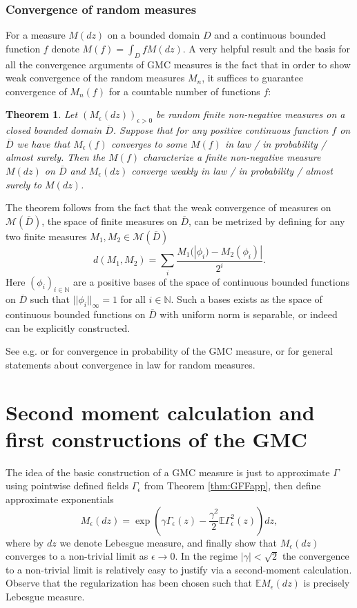 \documentclass[11pt]{amsart}
\newtheorem{thm}{Theorem}[section]
\newcommand{\N}{\mathbb N}
\newcommand{\E}{\mathbb E}
\renewcommand{\1}{\mathbf 1}
\newcommand{\eps}{\epsilon}
\begin{document}
\subsubsection{Convergence of random measures}
For a measure $M(dz)$ on a bounded domain $D$ and a continuous bounded function $f$ denote $M(f) = \int_D f M(dz)$. A very helpful result and the basis for all the convergence arguments of GMC measures is the fact that in order to show weak convergence of the random measures $M_n$, it suffices to guarantee convergence of $M_n(f)$ for a countable number of functions $f$:
 
\begin{thm}\label{thm:conv}
Let $(M_\eps(dz))_{\eps > 0}$ be random finite non-negative measures on a closed bounded domain $\overline{D}$. Suppose that for any positive continuous function $f$ on $\overline{D}$ we have that $M_\eps(f)$ converges to some $M(f)$ in law / in probability / almost surely. Then the $M(f)$ characterize a finite non-negative measure $M(dz)$ on $\overline{D}$ and $M_\eps(dz)$ converge weakly in law / in probability / almost surely to $M(dz)$. 
\end{thm}

The theorem follows from the fact that the weak convergence of measures on $\mathcal{M}(\overline{D})$, the space of finite measures on $\overline D$, can be metrized by defining for any two finite measures $M_1, M_2 \in \mathcal{M}(\overline{D})$ $$d(M_1, M_2) = \sum_i \frac{M_1(|\phi_i) - M_2(\phi_i)|}{2^i}.$$ Here $(\phi_i)_{i \in \N}$ are a positive bases of the space of continuous bounded functions on $\overline{D}$ such that $||\phi_i||_\infty = 1$ for all $i \in \N$. Such a bases exists as the space of continuous bounded functions on $\overline{D}$ with uniform norm is separable, or indeed can be explicitly constructed.

See e.g. \cite{Gar} or \cite{Ber} for convergence in probability of the GMC measure, or \cite{Kb} for general statements about convergence in law for random measures. 

\section{Second moment calculation and first constructions of the GMC}\label{sec:basic}

The idea of the basic construction of a GMC measure is just to approximate $\Gamma$ using pointwise defined fields $\Gamma_\eps$ from Theorem \ref{thm:GFFapp}, then define approximate exponentials $$M_\eps(dz) = \exp(\gamma \Gamma_\eps(z) - \frac{\gamma^2}{2}\E \Gamma_\eps^2(z))dz,$$ where by $dz$ we denote Lebesgue measure, and finally show that $M_\eps(dz)$ converges to a non-trivial limit as $\eps \to 0$. In the regime $|\gamma| < \sqrt{2}$ the convergence to a non-trivial limit is relatively easy to justify via a second-moment calculation. Observe that the regularization has been chosen such that $\E M_\eps(dz)$ is precisely Lebesgue measure.
\end{document}
